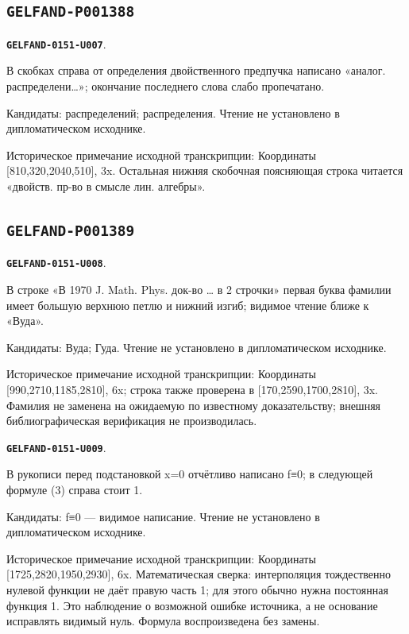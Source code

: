 \documentclass[11pt]{article}
\theoremstyle{definition}
\theoremstyle{remark}
\begin{document}
\subsection*{\texttt{GELFAND-P001388}}
\par\noindent\leavevmode{}\label{GELFAND-0151-U007}\label{GELFAND-P001388:dual-note:note}\textbf{\texttt{GELFAND-0151-U007}}.\nopagebreak[4]\par
В скобках справа от определения двойственного предпучка написано «аналог. распределени…»; окончание последнего слова слабо пропечатано.\par
Кандидаты: распределений; распределения. Чтение не установлено в дипломатическом исходнике.\par
Историческое примечание исходной транскрипции: Координаты [810,320,2040,510], 3x. Остальная нижняя скобочная поясняющая строка читается «двойств. пр-во в смысле лин. алгебры».\par\medskip
\subsection*{\texttt{GELFAND-P001389}}
\par\noindent\leavevmode{}\label{GELFAND-0151-U008}\label{GELFAND-P001389:author-name:note}\textbf{\texttt{GELFAND-0151-U008}}.\nopagebreak[4]\par
В строке «В 1970 J. Math. Phys. док-во … в 2 строчки» первая буква фамилии имеет большую верхнюю петлю и нижний изгиб; видимое чтение ближе к «Вуда».\par
Кандидаты: Вуда; Гуда. Чтение не установлено в дипломатическом исходнике.\par
Историческое примечание исходной транскрипции: Координаты [990,2710,1185,2810], 6x; строка также проверена в [170,2590,1700,2810], 3x. Фамилия не заменена на ожидаемую по известному доказательству; внешняя библиографическая верификация не производилась.\par\medskip
\par\noindent\leavevmode{}\label{GELFAND-0151-U009}\label{GELFAND-P001389:interpolation-function:note}\textbf{\texttt{GELFAND-0151-U009}}.\nopagebreak[4]\par
В рукописи перед подстановкой x=0 отчётливо написано f≡0; в следующей формуле (3) справа стоит 1.\par
Кандидаты: f≡0 — видимое написание. Чтение не установлено в дипломатическом исходнике.\par
Историческое примечание исходной транскрипции: Координаты [1725,2820,1950,2930], 6x. Математическая сверка: интерполяция тождественно нулевой функции не даёт правую часть 1; для этого обычно нужна постоянная функция 1. Это наблюдение о возможной ошибке источника, а не основание исправлять видимый нуль. Формула воспроизведена без замены.\par\medskip
\end{document}
